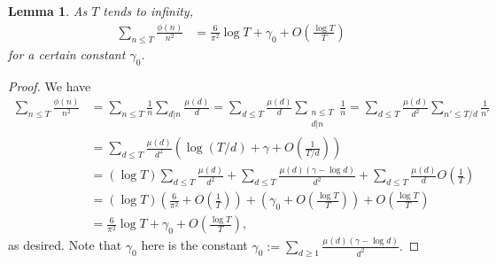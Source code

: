 \documentclass[11pt,letterpaper,reqno]{amsart}
\newtheorem{lemma}[theorem]{Lemma}
\numberwithin{equation}{section}
\numberwithin{figure}{section}
\numberwithin{table}{section}
\newcommand{\lrp}[1]{\left(#1\right)}
\begin{document}
\begin{lemma} \label{lem:sum-phi-over-a2}
    As $T$ tends to infinity, 
    \begin{align}
        \sum_{n \le T} \frac{\phi(n)}{n^2} &= \frac{6}{\pi^2} \log T + \gamma_0 + O\lrp{\frac{\log T}{T}} 
    \end{align}
    for a certain constant $\gamma_0$.
\end{lemma}
\begin{proof}
    We have 
    \begin{align}
        \sum_{n \le T} \frac{\phi(n)}{n^2} &= \sum_{n \le T} \frac{1}{n} \sum_{d|n} \frac{\mu(d)}{d} = \sum_{d \le T} \frac{\mu(d)}{d} \sum_{\substack{n \le T \\ d|n}} \frac{1}{n} = \sum_{d \le T} \frac{\mu(d)}{d^2} \sum_{n' \le T/d } \frac{1}{n'}  \\
        &= \sum_{d \le T} \frac{\mu(d)}{d^2} \lrp{\log (T/d) + \gamma + O\lrp{\frac{1}{T/d}} }
        \\
        &= (\log T) \sum_{d \le T} \frac{\mu(d)}{d^2} + \sum_{d \le T} \frac{\mu(d)(\gamma-\log d)}{d^2} + \sum_{d \le T} \frac{\mu(d)}{d} O\lrp{\frac1T}
        \\
        &= (\log T)\lrp{\frac{6}{\pi^2} + O\lrp{\frac1T}} + \lrp{\gamma_0 + O\lrp{\frac{\log T}{T}}} + O\lrp{\frac{\log T}{T}} \\
        &= \frac{6}{\pi^2} \log T + \gamma_0 + O\lrp{\frac{\log T}{T}},
    \end{align}
    as desired.
    Note that $\gamma_0$ here is the constant
    $\displaystyle
        \gamma_0 := \sum_{d \ge 1} \frac{\mu(d)(\gamma-\log d)}{d^2}.
    $
\end{proof}
\end{document}
